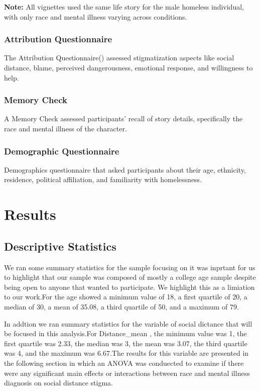 \documentclass[
  man,
  floatsintext,
  longtable,
  nolmodern,
  notxfonts,
  notimes,
  colorlinks=true,linkcolor=blue,citecolor=blue,urlcolor=blue]{apa7}
\begin{document}
\textbf{Note:} All vignettes used the same life story for the male
homeless individual, with only race and mental illness varying across
conditions.

\subsubsection{Attribution
Questionnaire}\label{attribution-questionnaire}

The Attribution
Questionnaire() assessed stigmatization aspects like social
distance, blame, perceived dangerousness, emotional response, and
willingness to help.

\subsubsection{Memory Check}\label{memory-check}

A Memory Check assessed participants' recall of story details,
specifically the race and mental illness of the character.

\subsubsection{Demographic
Questionnaire}\label{demographic-questionnaire}

Demographics questionnaire that asked participants about their age,
ethnicity, residence, political affiliation, and familiarity with
homelessness.

\section{Results}\label{results}

\subsection{Descriptive Statistics}\label{descriptive-statistics}

We ran some summary statistics for the sample focusing on it was
inprtant for us to highlight that our sample was composed of mostly a
college age sample despite being open to anyone that wanted to
participate. We highlight this as a limiation to our work.For the age
showed a minimum value of 18, a first quartile of 20, a median of 30, a
mean of 35.08, a third quartile of 50, and a maximum of 79.

In addtion we ran summary statistics for the variable of social dictance
that will be focused in this analysis.For Distance\_mean , the minimum
value was 1, the first quartile was 2.33, the median was 3, the mean was
3.07, the third quartile was 4, and the maximum was 6.67.The results for
this variable are presented in the following section in which an ANOVA
was conduected to examine if there were any significant main effects or
interactions between race and mental illness diagnosis on social
distance stigma.
\end{document}

